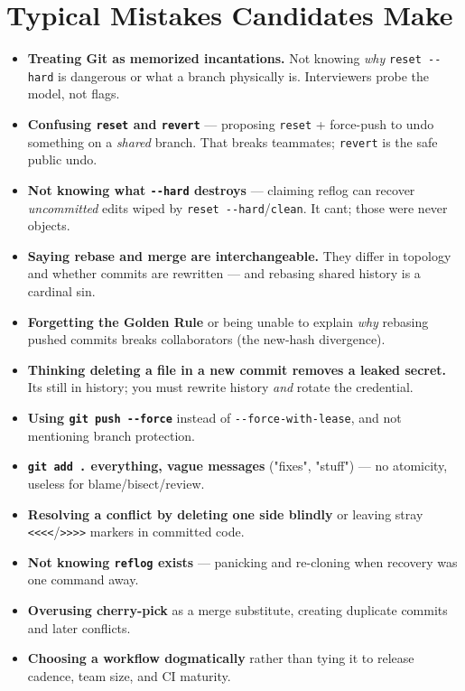 \documentclass[11pt]{article}
\providecommand{\tightlist}{\setlength{\itemsep}{1pt}\setlength{\parskip}{0pt}}
\begin{document}
\section{Typical Mistakes Candidates Make}\label{typical-mistakes-candidates-make}

\begin{itemize}
\tightlist
\item
  \textbf{Treating Git as memorized incantations.} Not knowing \emph{why} \texttt{reset\ -\/-hard} is dangerous or what a branch physically is. Interviewers probe the model, not flags.
\item
  \textbf{Confusing \texttt{reset} and \texttt{revert}} --- proposing \texttt{reset} + force-push to undo something on a \emph{shared} branch. That breaks teammates; \texttt{revert} is the safe public undo.
\item
  \textbf{Not knowing what \texttt{-\/-hard} destroys} --- claiming reflog can recover \emph{uncommitted} edits wiped by \texttt{reset\ -\/-hard}/\texttt{clean}. It can\textquotesingle t; those were never objects.
\item
  \textbf{Saying rebase and merge are interchangeable.} They differ in topology and whether commits are rewritten --- and rebasing shared history is a cardinal sin.
\item
  \textbf{Forgetting the Golden Rule} or being unable to explain \emph{why} rebasing pushed commits breaks collaborators (the new-hash divergence).
\item
  \textbf{Thinking deleting a file in a new commit removes a leaked secret.} It\textquotesingle s still in history; you must rewrite history \emph{and} rotate the credential.
\item
  \textbf{Using \texttt{git\ push\ -\/-force}} instead of \texttt{-\/-force-with-lease}, and not mentioning branch protection.
\item
  \textbf{\texttt{git\ add\ .} everything, vague messages} ("fixes", "stuff") --- no atomicity, useless for blame/bisect/review.
\item
  \textbf{Resolving a conflict by deleting one side blindly} or leaving stray \texttt{\textless{}\textless{}\textless{}\textless{}}/\texttt{\textgreater{}\textgreater{}\textgreater{}\textgreater{}} markers in committed code.
\item
  \textbf{Not knowing \texttt{reflog} exists} --- panicking and re-cloning when recovery was one command away.
\item
  \textbf{Overusing cherry-pick} as a merge substitute, creating duplicate commits and later conflicts.
\item
  \textbf{Choosing a workflow dogmatically} rather than tying it to release cadence, team size, and CI maturity.
\end{itemize}
\end{document}
